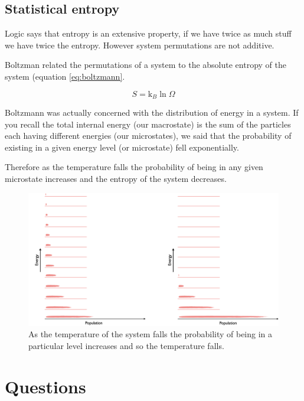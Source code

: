 \documentclass[
]{book}
\begin{document}
\hypertarget{statistical-entropy}{%
\subsection{Statistical entropy}\label{statistical-entropy}}

Logic says that entropy is an extensive property, if we have twice as much stuff we have twice the entropy. However system permutations are not additive.

Boltzman related the permutations of a system to the absolute entropy of the system (equation \eqref{eq:boltzmann}.

\begin{equation}
S=\textrm{k}_B \ln \Omega
\label{eq:boltzmann}
\end{equation}

Boltzmann was actually concerned with the distribution of energy in a system. If you recall the total internal energy (our macrostate) is the sum of the particles each having different energies (our microstates), we said that the probability of existing in a given energy level (or microstate) fell exponentially.

Therefore as the temperature falls the probability of being in any given microstate increases and the entropy of the system decreases.

\begin{figure}

{\centering \includegraphics[width=0.8\linewidth]{images/tempentropy} 

}

\caption{As the temperature of the system falls the probability of being in a particular level increases and so the temperature falls.}\label{fig:tempentropy}
\end{figure}

\hypertarget{sec:w3p1question}{%
\section{Questions}\label{sec:w3p1question}}
\end{document}
